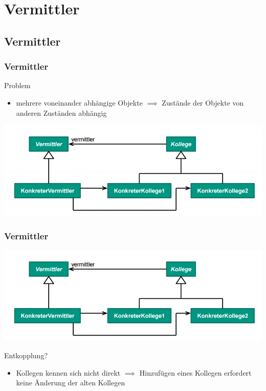\documentclass[18pt]{beamer}
\begin{document}

\section{Vermittler}
	\subsection{Vermittler}
		\begin{frame}
		\frametitle{Vermittler}
		\begin{block}{Problem}
			\begin{itemize}
				\item mehrere voneinander abhängige Objekte \linebreak \pause $\implies$ Zustände der Objekte von anderen Zuständen abhängig
			\end{itemize}
		\end{block}
		\pause
		\centering
		\includegraphics[scale=0.45]{./pics/tut3/med.png}
	\end{frame}

	\begin{frame}
		\frametitle{Vermittler}
		\centering
		\includegraphics[scale=0.45]{./pics/tut3/med.png}
		\begin{block}{Entkopplung?}
			\begin{itemize}
				\pause 
				\item Kollegen kennen sich nicht direkt  \linebreak \pause $\implies$ Hinzufügen eines Kollegen erfordert keine Änderung der alten Kollegen
			\end{itemize}
		\end{block}
	\end{frame}
\end{document}
